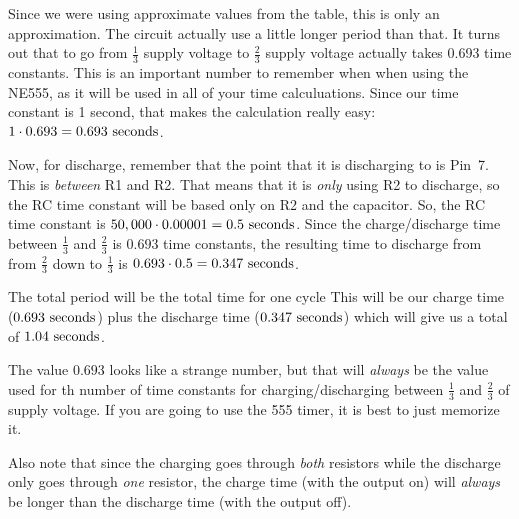 Since we were using approximate values from the table, this is only an approximation.
The circuit actually use a little longer period than that.
It turns out that to go from $\frac{1}{3}$ supply voltage to $\frac{2}{3}$ supply voltage actually takes 0.693 time constants.
This is an important number to remember when when using the NE555, as it will be used in all of your time calculuations.
Since our time constant is 1 second, that makes the calculation really easy: $1\cdot 0.693 = 0.693\textrm{ seconds}$.

Now, for discharge, remember that the point that it is discharging to is Pin~7.
This is \emph{between} R1 and R2.
That means that it is \emph{only} using R2 to discharge, so the RC time constant will be based only on R2 and the capacitor.
So, the RC time constant is $50,000 \cdot 0.00001 = 0.5\textrm{ seconds}$.
Since the charge/discharge time between $\frac{1}{3}$ and $\frac{2}{3}$ is $0.693$ time constants, the resulting time to discharge from from $\frac{2}{3}$ down to $\frac{1}{3}$ is $0.693 \cdot 0.5 = 0.347\textrm{ seconds}$.

The total period will be the total time for one cycle
This will be our charge time ($0.693\textrm{ seconds}$) plus the discharge time ($0.347\textrm{ seconds}$) which will give us a total of $1.04\textrm{ seconds}$.

The value $0.693$ looks like a strange number, but that will \emph{always} be the value used for th number of time constants for charging/discharging between $\frac{1}{3}$ and $\frac{2}{3}$ of supply voltage.
If you are going to use the 555 timer, it is best to just memorize it.

Also note that since the charging goes through \emph{both} resistors while the discharge only goes through \emph{one} resistor, the charge time (with the output on) will \emph{always} be longer than the discharge time (with the output off).

